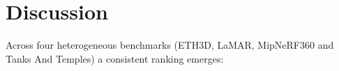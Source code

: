 






\chapter{Discussion}\label{chap:discussion}
Across four heterogeneous benchmarks (ETH3D, LaMAR, MipNeRF360 and Tanks And Temples) a consistent ranking emerges:

